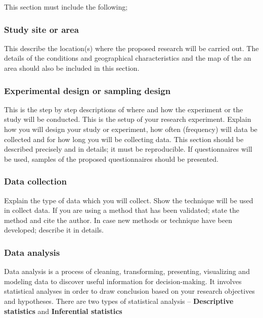 \documentclass[
  12pt,
  a4paper,
  DIV=11,
  numbers=noendperiod]{scrartcl}
\begin{document}
This section must include the following;

\hypertarget{study-site-or-area}{%
\subsubsection{Study site or area}\label{study-site-or-area}}

This describe the location(s) where the proposed research will be
carried out. The details of the conditions and geographical
characteristics and the map of the an area should also be included in
this section.

\hypertarget{experimental-design-or-sampling-design}{%
\subsubsection{Experimental design or sampling
design}\label{experimental-design-or-sampling-design}}

This is the step by step descriptions of where and how the experiment or
the study will be conducted. This is the setup of your research
experiment. Explain how you will design your study or experiment, how
often (frequency) will data be collected and for how long you will be
collecting data. This section should be described precisely and in
details; it must be reproducible. If questionnaires will be used,
samples of the proposed questionnaires should be presented.

\hypertarget{data-collection}{%
\subsubsection{Data collection}\label{data-collection}}

Explain the type of data which you will collect. Show the technique will
be used in collect data. If you are using a method that has been
validated; state the method and cite the author. In case new methods or
technique have been developed; describe it in details.

\hypertarget{data-analysis}{%
\subsubsection{Data analysis}\label{data-analysis}}

Data analysis is a process of cleaning, transforming, presenting,
visualizing and modeling data to discover useful information for
decision-making. It involves statistical analyses in order to draw
conclusion based on your research objectives and hypotheses. There are
two types of statistical analysis -- \textbf{Descriptive statistics} and
\textbf{Inferential statistics}
\end{document}
